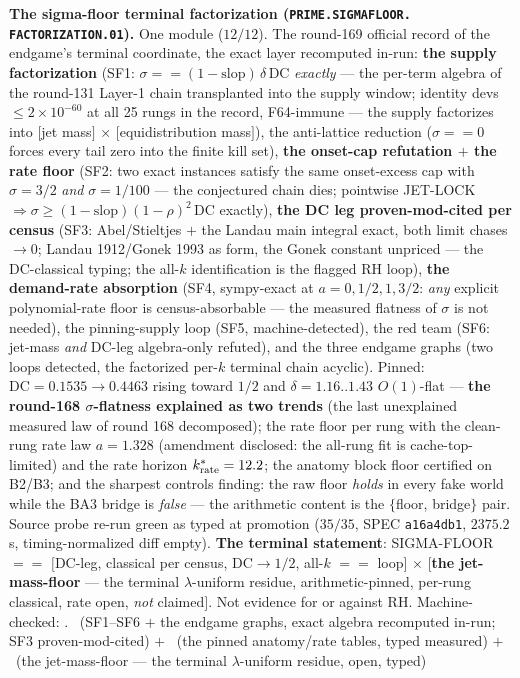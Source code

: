 \documentclass[11pt,a4paper]{article}
\theoremstyle{definition}
\begin{document}
\par\smallskip\noindent\textbf{The sigma-floor terminal
factorization (\texttt{PRIME.\allowbreak SIGMAFLOOR.\allowbreak
FACTORIZATION.01}).}
One module ($12/12$).  The round-169 official record of the
endgame's terminal coordinate, the exact layer recomputed
in-run: \textbf{the supply factorization} (SF1: $\sigma == (1 -
\mathrm{slop})\,\delta\,\mathrm{DC}$ \emph{exactly} --- the
per-term algebra of the round-131 Layer-1 chain transplanted
into the supply window; identity devs $\le 2\times10^{-60}$ at
all 25 rungs in the record, F64-immune --- the supply
factorizes into $[$jet mass$]$ $\times$ $[$equidistribution
mass$]$), the anti-lattice reduction ($\sigma == 0$ forces every
tail zero into the finite kill set), \textbf{the onset-cap
refutation $+$ the rate floor} (SF2: two exact instances
satisfy the same onset-excess cap with $\sigma = 3/2$ \emph{and}
$\sigma = 1/100$ --- the conjectured chain dies; pointwise
JET-LOCK $\Rightarrow \sigma \ge (1 - \mathrm{slop})(1 -
\rho)^2\,\mathrm{DC}$ exactly), \textbf{the DC leg
proven-mod-cited per census} (SF3: Abel/Stieltjes $+$ the Landau
main integral exact, both limit chases $\to 0$; Landau
1912/Gonek 1993 as form, the Gonek constant unpriced --- the
DC-classical typing; the all-$k$ identification is the flagged
RH loop), \textbf{the demand-rate absorption} (SF4, sympy-exact
at $a = 0, 1/2, 1, 3/2$: \emph{any} explicit polynomial-rate
floor is census-absorbable --- the measured flatness of
$\sigma$ is not needed), the pinning-supply loop (SF5,
machine-detected), the red team (SF6: jet-mass \emph{and}
DC-leg algebra-only refuted), and the three endgame graphs (two
loops detected, the factorized per-$k$ terminal chain acyclic).
Pinned: $\mathrm{DC} = 0.1535 \to 0.4463$ rising toward $1/2$
and $\delta = 1.16..1.43$ $O(1)$-flat --- \textbf{the round-168
$\sigma$-flatness explained as two trends} (the last unexplained
measured law of round 168 decomposed); the rate floor per rung
with the clean-rung rate law $a = 1.328$ (amendment disclosed:
the all-rung fit is cache-top-limited) and the rate horizon
$k^*_{\rm rate} = 12.2$; the anatomy block floor certified on
B2/B3; and the sharpest controls finding: the raw floor
\emph{holds} in every fake world while the BA3 bridge is
\emph{false} --- the arithmetic content is the $\{$floor,
bridge$\}$ pair.  Source probe re-run green as typed at
promotion ($35/35$, SPEC \texttt{a16a4db1}, $2375.2$ s,
timing-normalized diff empty).  \textbf{The terminal statement}:
SIGMA-FLOOR $==$ $[$DC-leg, classical per census, $\mathrm{DC}
\to 1/2$, all-$k$ $==$ loop$]$ $\times$ $[$\textbf{the
jet-mass-floor} --- the terminal $\lambda$-uniform residue,
arithmetic-pinned, per-rung classical, rate open, \emph{not}
claimed$]$.  Not evidence for or against RH.
Machine-checked: .
\mE\ (SF1--SF6 $+$ the endgame graphs, exact algebra recomputed
in-run; SF3 proven-mod-cited) $+$ \mC\ (the pinned anatomy/rate
tables, typed measured) $+$ \mO\ (the jet-mass-floor --- the
terminal $\lambda$-uniform residue, open, typed)
\par\smallskip
\end{document}
